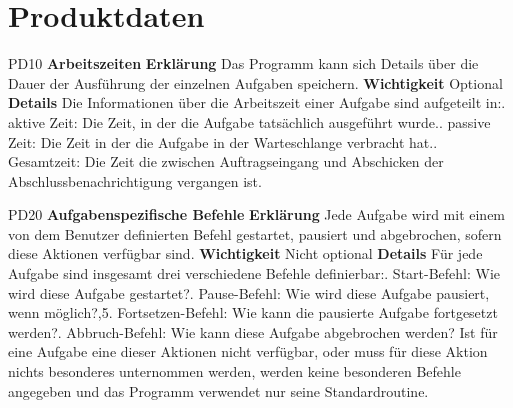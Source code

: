 \documentclass[a4paper,12pt]{article}
\begin{document}
\section{Produktdaten}
\begin{itemize}[nosep]
\leftskip=0.5cm

\begin{comment}

\begin{minipage}[t]{\linewidth}
\item[PD00] \textbf{}
\subitem \textbf{Erklärung} 
\subitem \textbf{Wichtigkeit} 
\subitem \textbf{Details} 
\end{minipage}
\pagebreak

\end{comment}

\begin{minipage}[t]{\linewidth}
\item[PD10] \textbf{Arbeitszeiten}
\subitem \textbf{Erklärung} Das Programm kann sich Details über die Dauer der Ausführung der einzelnen Aufgaben speichern.
\subitem \textbf{Wichtigkeit} Optional
\subitem \textbf{Details} Die Informationen über die Arbeitszeit einer Aufgabe sind aufgeteilt in:. aktive Zeit: Die Zeit, in der die Aufgabe tatsächlich ausgeführt wurde.. passive Zeit: Die Zeit in der die Aufgabe in der Warteschlange verbracht hat.. Gesamtzeit: Die Zeit die zwischen Auftragseingang und Abschicken der Abschlussbenachrichtigung vergangen ist.
\end{minipage}
\pagebreak

\begin{minipage}[t]{\linewidth}
\item[PD20] \textbf{Aufgabenspezifische Befehle}
\subitem \textbf{Erklärung} Jede Aufgabe wird mit einem von dem Benutzer definierten Befehl gestartet, pausiert und abgebrochen, sofern diese Aktionen verfügbar sind.
\subitem \textbf{Wichtigkeit} Nicht optional
\subitem \textbf{Details} Für jede Aufgabe sind insgesamt drei verschiedene Befehle definierbar:. Start-Befehl: Wie wird diese Aufgabe gestartet?. Pause-Befehl: Wie wird diese Aufgabe pausiert, wenn möglich?,5. Fortsetzen-Befehl: Wie kann die pausierte Aufgabe fortgesetzt werden?. Abbruch-Befehl: Wie kann diese Aufgabe abgebrochen werden?\newline
Ist für eine Aufgabe eine dieser Aktionen nicht verfügbar, oder muss für diese Aktion nichts besonderes unternommen werden, werden keine besonderen Befehle angegeben und das Programm verwendet nur seine Standardroutine.
\end{minipage}
\pagebreak


\end{itemize}
\end{document}
